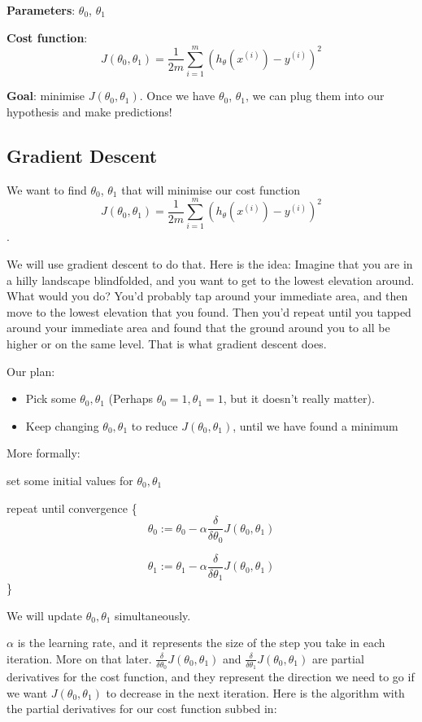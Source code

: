 \documentclass[12pt]{article}
\begin{document}
\textbf{Parameters}: $\theta_0$, $\theta_1$

\textbf{Cost function}: \[J(\theta_0, \theta_1) = \frac{1}{2m} \sum^m_{i=1}(h_\theta(x^{(i)}) - y^{(i)})^2\]

\textbf{Goal}: minimise $J(\theta_0, \theta_1)$. Once we have $\theta_0$, $\theta_1$, we can plug them into our hypothesis and make predictions! 

\subsection{Gradient Descent}

We want to find $\theta_0$, $\theta_1$ that will minimise our cost function \[J(\theta_0, \theta_1) = \frac{1}{2m} \sum^m_{i=1}(h_\theta(x^{(i)}) - y^{(i)})^2\].

We will use gradient descent to do that. Here is the idea: Imagine that you are in a hilly landscape blindfolded, and you want to get to the lowest elevation around. What would you do? You'd probably tap around your immediate area, and then move to the lowest elevation that you found. Then you'd repeat until you tapped around your immediate area and found that the ground around you to all be higher or on the same level. That is what gradient descent does.

Our plan:
\begin{itemize}
\item Pick some $\theta_0, \theta_1$ (Perhaps $\theta_0=1, \theta_1=1$, but it doesn't really matter).
\item Keep changing  $\theta_0, \theta_1$ to reduce $J(\theta_0, \theta_1)$, until we have found a minimum 
\end{itemize}

More formally:

set some initial values for $\theta_0, \theta_1$

repeat until convergence \{
\[\theta_0 := \theta_0 - \alpha \frac{\delta}{\delta \theta_0} J(\theta_0, \theta_1)\]

\[\theta_1 := \theta_1 - \alpha \frac{\delta}{\delta \theta_1} J(\theta_0, \theta_1)\]
\}


We will update  $\theta_0, \theta_1$ simultaneously. 

$\alpha$ is the learning rate, and it represents the size of the step you take in each iteration. More on that later.  $\frac{\delta}{\delta \theta_0} J(\theta_0, \theta_1) $ and $\frac{\delta}{\delta \theta_1} J(\theta_0, \theta_1) $ are partial derivatives for the cost function, and they represent the direction we need to go if we want $J(\theta_0, \theta_1)$ to decrease in the next iteration. Here is the algorithm with the partial derivatives for our cost function subbed in:
\end{document}
